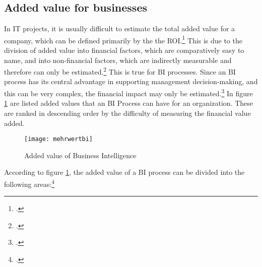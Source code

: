 \subsection{Added value for businesses} \label{toc:strategischermehrwert}

In IT projects, it is usually difficult to estimate the total added value for a company, which can be defined primarily by the
the \ac{ROI}.\footcite[Cf.][p. 97]{hovcevar2010assessing} This is due to the division of added value
into financial factors, which are comparatively easy to name, and into non-financial factors, which are indirectly measurable
and therefore can only be estimated.\footcite[Cf.][p. 93]{hovcevar2010assessing} This is true for \ac{BI} processes. Since an \ac{BI}
process has its central advantage in supporting management decision-making, and this can be very complex, the
financial impact may only be estimated.\footcite[Cf.][pp. 94]{hovcevar2010assessing} In figure
\ref{figure:mehrwertbi} are listed added values that an \ac{BI} Process can have for an organization. These are ranked in descending order
by the difficulty of measuring the financial value added.

\begin{figure}[H]
    \caption{Added value of Business Intelligence}
    \texttt{[image: mehrwertbi]}
    \label{figure:mehrwertbi}
    \\
    \cite[Source: Based on][Fig. 2]{watson2007current}
\end{figure}

According to figure \ref{figure:mehrwertbi}, the added value of a BI process can be divided into the following areas:\footcite[Cf.][Fig. 2]{watson2007current}

